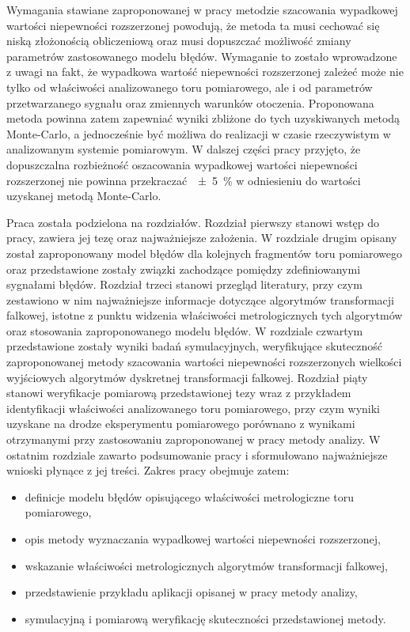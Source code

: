 Wymagania stawiane zaproponowanej w pracy metodzie szacowania wypadkowej wartości niepewności rozszerzonej powodują, że metoda ta musi cechować się niską złożonością obliczeniową oraz musi dopuszczać możliwość zmiany parametrów zastosowanego modelu błędów. Wymaganie to zostało wprowadzone z uwagi na fakt, że wypadkowa wartość niepewności rozszerzonej zależeć może nie tylko od właściwości analizowanego toru pomiarowego, ale i od parametrów przetwarzanego sygnału oraz zmiennych warunków otoczenia. Proponowana metoda powinna zatem zapewniać wyniki zbliżone do tych uzyskiwanych metodą Monte-Carlo, a jednocześnie być możliwa do realizacji w czasie rzeczywistym w analizowanym systemie pomiarowym. W dalszej części pracy przyjęto, że dopuszczalna rozbieżność oszacowania wypadkowej wartości niepewności rozszerzonej nie powinna przekraczać~\qty{\pm 5}{\percent} w odniesieniu do wartości uzyskanej metodą Monte-Carlo.

Praca została podzielona na  rozdziałów. Rozdział pierwszy stanowi wstęp do pracy, zawiera jej tezę oraz najważniejsze założenia. W rozdziale drugim opisany został zaproponowany model błędów dla kolejnych fragmentów toru pomiarowego oraz przedstawione zostały związki zachodzące pomiędzy zdefiniowanymi sygnałami błędów. Rozdział trzeci stanowi przegląd literatury, przy czym zestawiono w nim najważniejsze informacje dotyczące algorytmów transformacji falkowej, istotne z punktu widzenia właściwości metrologicznych tych algorytmów oraz stosowania zaproponowanego modelu błędów. W rozdziale czwartym przedstawione zostały wyniki badań symulacyjnych, weryfikujące skuteczność zaproponowanej metody szacowania wartości niepewności rozszerzonych wielkości wyjściowych algorytmów dyskretnej transformacji falkowej. Rozdział piąty stanowi weryfikacje pomiarową przedstawionej tezy wraz z przykładem identyfikacji właściwości analizowanego toru pomiarowego, przy czym wyniki uzyskane na drodze eksperymentu pomiarowego porównano z wynikami otrzymanymi przy zastosowaniu zaproponowanej w pracy metody analizy. W ostatnim rozdziale zawarto podsumowanie pracy i sformułowano najważniejsze wnioski płynące z jej treści. Zakres pracy obejmuje zatem:
\begin{itemize}
\item definicje modelu błędów opisującego właściwości metrologiczne toru pomiarowego,
\item opis metody wyznaczania wypadkowej wartości niepewności rozszerzonej,
\item wskazanie właściwości metrologicznych algorytmów transformacji falkowej,
\item przedstawienie przykładu aplikacji opisanej w pracy metody analizy,
\item symulacyjną i pomiarową weryfikację skuteczności przedstawionej metody.
\end{itemize}

